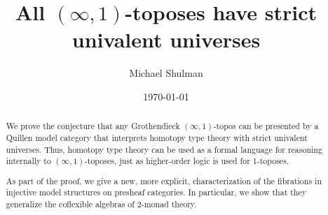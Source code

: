 \documentclass[12pt]{amsart}
\title{All $(\infty,1)$-toposes have strict univalent universes}
\author{Michael Shulman}
\date{\today}
\def\io{\ensuremath{(\infty,1)}}
\begin{document}
\maketitle

\begin{abstract}
  We prove the conjecture that any Grothendieck \io-topos can be presented by a Quillen model category that interprets homotopy type theory with strict univalent universes.
  Thus, homotopy type theory can be used as a formal language for reasoning internally to \io-toposes, just as higher-order logic is used for 1-toposes.

  As part of the proof, we give a new, more explicit, characterization of the fibrations in injective model structures on presheaf categories.
  In particular, we show that they generalize the coflexible algebras of 2-monad theory.
\end{abstract}

\DeclareRobustCommand{\gobblefive}[5]{}
\newcommand*{\skiptoc}{\addtocontents{toc}{\gobblefive}}
\setcounter{tocdepth}{1}

\newpage
\tableofcontents
\newpage




















\appendix





\end{document}
